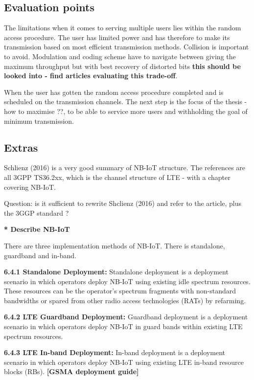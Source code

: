 \documentclass[10pt,a4paper,titlepage,twoside]{article}
\newcommand{\tilv}[1]{\textbf{\color{ymagreen}[#1]}}
\newcommand{\point}[1]{\textbf{\color{ymared} #1}}
\begin{document}
\subsection{Evaluation points}

The limitations when it comes to serving multiple users lies within the random access procedure. The user has limited power and has therefore to make its transmission based on most efficient transmission methods. Collision is important to avoid. Modulation and coding scheme have to navigate between giving the maximum throughput but with best recovery of distorted bits \point{this should be looked into - find articles evaluating this trade-off}.

When the user has gotten the random access procedure completed and is scheduled on the transmission channels. The next step is the focus of the thesis - how to maximise ??, to be able to service more users and withholding the goal of minimum transmission.


\subsection{Extras}

Schlienz (2016) \cite{schlienz} is a very good summary of NB-IoT structure. The references are all 3GPP TS36.2xx, which is the channel structure of LTE - with a chapter covering NB-IoT.

Question: is it sufficient to rewrite Shclienz (2016) and refer to the article, plus the 3GGP standard ?

\point{* Describe NB-IoT}

There are three implementation methods of NB-IoT. There is standalone, guardband and in-band.

\textbf{6.4.1 Standalone Deployment:}
Standalone deployment is a deployment scenario in which operators deploy NB-IoT using
existing idle spectrum resources. These resources can be the operator’s spectrum
fragments with non-standard bandwidths or spared from other radio access technologies
(RATs) by refarming.

\textbf{6.4.2 LTE Guardband Deployment:}
Guardband deployment is a deployment scenario in which operators deploy NB-IoT in guard
bands within existing LTE spectrum resources.

\textbf{6.4.3 LTE In-band Deployment:}
In-band deployment is a deployment scenario in which operators deploy NB-IoT using
existing LTE in-band resource blocks (RBs).
\tilv{GSMA deployment guide}
\end{document}
